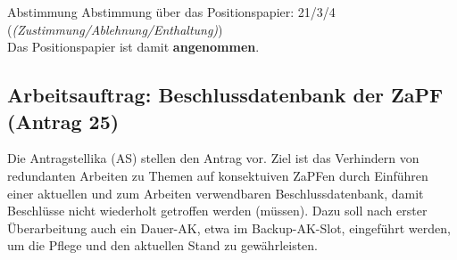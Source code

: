     \begin{success}{Abstimmung}
      Abstimmung über das Positionspapier: 21/3/4 (\textit{(Zustimmung/Ablehnung/Enthaltung)}) \\
      Das Positionspapier ist damit \textbf{angenommen}.
    \end{success}

    \subsection{Arbeitsauftrag: Beschlussdatenbank der ZaPF (Antrag 25)}
    Die Antragstellika (AS) stellen den Antrag vor.
    Ziel ist das Verhindern von redundanten Arbeiten zu Themen auf konsektuiven ZaPFen durch Einführen einer aktuellen und zum Arbeiten verwendbaren Beschlussdatenbank, damit Beschlüsse nicht wiederholt getroffen werden (müssen).
    Dazu soll nach erster Überarbeitung auch ein Dauer-AK, etwa im Backup-AK-Slot, eingeführt werden, um die Pflege und den aktuellen Stand zu gewährleisten.

